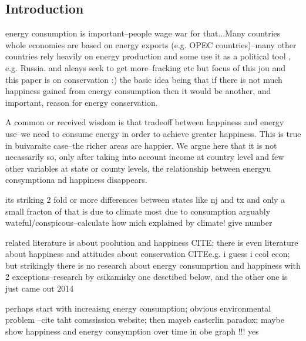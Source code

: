 \documentclass[10pt, letterpaper]{article}
\begin{document}
\begin{spacing}{1.4}



\section{Introduction}

energy consumption is important--people wage war for that...Many countries whole
economies are based on energy exports (e.g. OPEC countries)--many other
countries rely heavily on energy production and some use it as a political tool
, e.g. Russia. 
and aleays seek to get more--fracking etc
but focus of this jou and this paper is on conservation :)
the basic idea being that if there is not much happiness gained from energy
consumption then it would be another, and important, reason for energy
conservation. 

A common or received wisdom is that tradeoff between happiness and energy
use--we need to consume energy in order to achieve greater happiness. This is
true in buivaraite case--the richer areas are happier.
 We argue
here that it is not necassarily so, only after taking into account income at
country level and few other variables at state or county levels, the
relationship between energyu consymptiona nd happiness disappears.


its striking 2 fold or more differences between states like nj and tx and only a
small fracton of that is due to climate most due to consumption arguably
wateful/conspicous--calculate how mich explained by climate! give number

related literature is about poolution and happiness CITE; there is even
literature about happiness and attitudes about conservation CITEe.g. i guess i
ecol econ; but strikingly there is no research about energy consumprtion and
happiness with 2 exceptions--research by csikamisky one desctibed below, and the
other one is just came out 2014

perhaps start with increaisng energy consumption; obvious environmental problem
--cite taht comssission website; then mayeb easterlin paradox; maybe show
happiness and energy consymption over time in obe graph !!! yes


\end{spacing}
\end{document}
